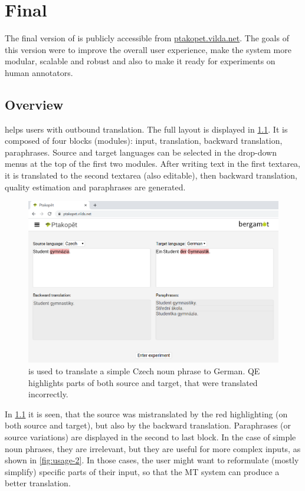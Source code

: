 \chapter{Final \ptakopet{}} \label{chp:usage}

The final version of \ptakopet{} is publicly accessible from \href{https://ptakopet.vilda.net}{ptakopet.vilda.net}. The goals of this version were to improve the overall user experience, make the system more modular, scalable and robust and also to make it ready for experiments on human annotators.

\section{Overview}

\ptakopet{} helps users with outbound translation. The full layout is displayed in \cref{fig:usage-1}. It is composed of four blocks (modules): input, translation, backward translation, paraphrases. Source and target languages can be selected in the drop-down menus at the top of the first two modules. After writing text in the first textarea, it is translated to the second textarea (also editable), then backward translation, quality estimation and paraphrases are generated.

\begin{figure}[ht]
  \centering
  \includegraphics[width=\textwidth]{img/usage/usage-1.png}
  \caption{\label{fig:usage-1} \ptakopet{} is used to translate a simple Czech noun phrase to German. QE highlights parts of both source and target, that were translated incorrectly.}
\end{figure}

In \cref{fig:usage-1} it is seen, that the source was mistranslated by the red highlighting (on both source and target), but also by the backward translation. Paraphrases (or source variations) are displayed in the second to last block. In the case of simple noun phrases, they are irrelevant, but they are useful for more complex inputs, as shown in \cref{fig:usage-2}. In those cases, the user might want to reformulate (mostly simplify) specific parts of their input, so that the MT system can produce a better translation. 

